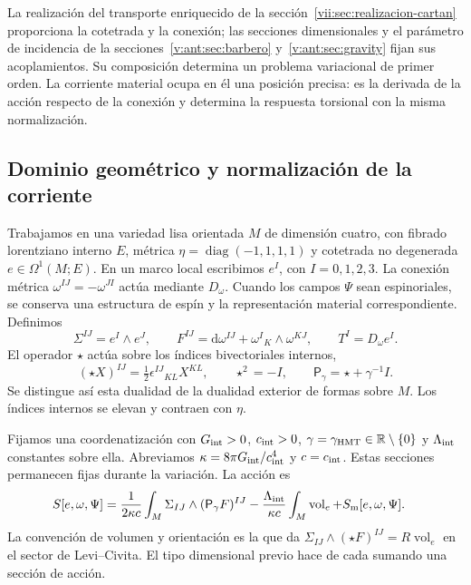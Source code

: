 La realización del transporte enriquecido de la
sección~\ref{vii:sec:realizacion-cartan} proporciona la cotetrada y la
conexión; las secciones dimensionales y el parámetro de incidencia de la
secciones~\ref{v:ant:sec:barbero} y~\ref{v:ant:sec:gravity} fijan sus acoplamientos. Su composición
determina un problema variacional de primer orden. La corriente material
ocupa en él una posición precisa: es la derivada de la acción respecto de
la conexión y determina la respuesta torsional con la misma normalización.

\subsection{Dominio geométrico y normalización de la corriente}
\label{vii:subsec:dominio-corriente-cartan}

Trabajamos en una variedad lisa orientada \(M\) de dimensión cuatro,
con fibrado lorentziano interno \(E\), métrica
\(\eta=\operatorname{diag}(-1,1,1,1)\) y cotetrada no degenerada
\(e\in\Omega^1(M;E)\). En un marco local escribimos
\(e^I\), con \(I=0,1,2,3\). La conexión métrica
\(\omega^{IJ}=-\omega^{JI}\) actúa mediante \(D_\omega\).
Cuando los campos \(\Psi\) sean espinoriales, se conserva una estructura
de espín y la representación material correspondiente. Definimos
\begin{equation}
 \Sigma^{IJ}=e^I\wedge e^J,\qquad
 F^{IJ}=\mathrm d\omega^{IJ}+\omega^I{}_{K}\wedge\omega^{KJ},
 \qquad T^I=D_\omega e^I.
 \label{vii:eq:campos-cartan}
\end{equation}
El operador \(\star\) actúa sobre los índices bivectoriales internos,
\begin{equation}
 (\star X)^{IJ}=\tfrac12\epsilon^{IJ}{}_{KL}X^{KL},
 \qquad \star^2=-I,\qquad
 \mathsf P_\gamma=\star+\gamma^{-1}I.
 \label{vii:eq:operador-holst}
\end{equation}
Se distingue así esta dualidad de la dualidad exterior de formas sobre
\(M\). Los índices internos se elevan y contraen con \(\eta\).

Fijamos una coordenatización con \(G_{\rm int}>0\), \(c_{\rm int}>0\),
\(\gamma=\gamma_{\rm HMT}\in\mathbb R\setminus\{0\}\) y
\(\Lambda_{\rm int}\) constantes sobre ella. Abreviamos
\(\kappa=8\pi G_{\rm int}/c_{\rm int}^4\) y \(c=c_{\rm int}\).
Estas secciones permanecen fijas durante la variación. La acción es
\begin{equation}
 \begin{split}
 S[e,\omega,\Psi]={}&
 \frac1{2\kappa c}\int_M\Sigma_{IJ}\wedge
                         (\mathsf P_\gamma F)^{IJ}
 -\frac{\Lambda_{\rm int}}{\kappa c}
                         \int_M\operatorname{vol}_e
 +S_{\rm m}[e,\omega,\Psi].
 \end{split}
 \label{vii:eq:accion-cartan-holst}
\end{equation}
La convención de volumen y orientación es la que da
\(\Sigma_{IJ}\wedge(\star F)^{IJ}=R\operatorname{vol}_e\)
en el sector de Levi--Civita. El tipo dimensional previo hace de cada
sumando una sección de acción.

